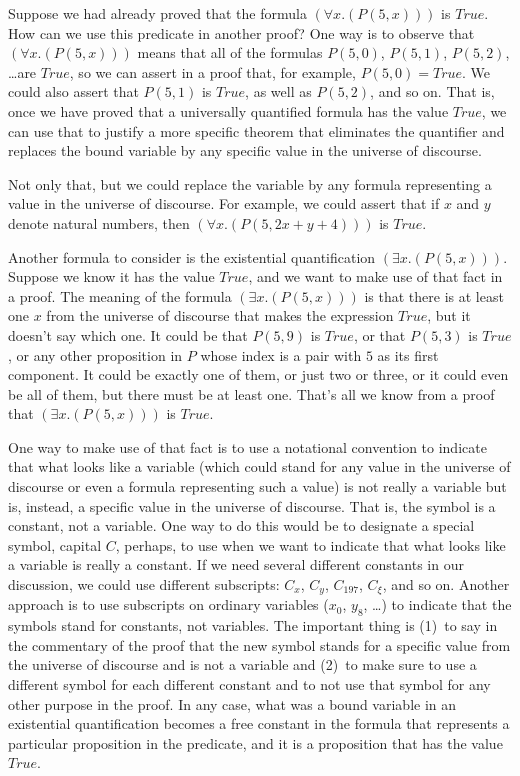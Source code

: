{{Suppose we had already proved that the formula $(\forall x.(P(5, x)))$ is $True$.
How can we use this predicate in another proof?
One way is to observe that $(\forall x.(P(5, x)))$ means that all of the formulas
$P(5, 0)$, $P(5, 1)$, $P(5, 2)$, \dots are $True$,
so we can assert in a proof that, for example,
$P(5, 0) = True$. We could also assert that $P(5, 1)$ is $True$, as well as $P(5, 2)$, and so on.
That is, once we have proved that a universally quantified formula has the value $True$,
we can use that to justify a more specific theorem that
eliminates the quantifier and replaces the bound variable by any specific value
in the universe of discourse.

Not only that, but we could replace the variable by any formula
representing a value in the universe of discourse.
For example, we could assert that if $x$ and $y$ denote natural numbers,
then $(\forall x.(P(5, 2x + y + 4)))$ is $True$.

Another formula to consider is the existential quantification $(\exists x.(P(5, x)))$.
Suppose we know it has the value $True$, and we want to make use of that fact in a proof.
The meaning of the formula $(\exists x.(P(5, x)))$ is that
there is at least one $x$ from the universe of discourse that makes the expression $True$,
but it doesn't say which one.
It could be that $P(5, 9)$ is $True$, or that $P(5, 3)$ is $True$,
or any other proposition in $P$ whose index is a pair with $5$ as its first component.
It could be exactly one of them,
or just two or three, or it could even be all of them, but
there must be at least one. That's all we know
from a proof that $(\exists x.(P(5, x)))$ is $True$.

One way to make use of that fact is to use a notational convention
to indicate that what looks like a variable (which could stand for any
value in the universe of discourse or even a formula representing such a value)
is not really a variable but is, instead, a specific value in the universe of
discourse. That is, the symbol is a constant, not a variable.
One way to do this would be to designate a special symbol, capital $C$, perhaps,
to use when we want to indicate that what looks like a variable is really a constant.
\label{def:skolem-constant}
If we need several different constants in our discussion, we could use different
subscripts: $C_x$, $C_y$, $C_{197}$, $C_{\xi}$, and so on.
Another approach is to use subscripts on ordinary variables ($x_0$, $y_8$, \dots)
to indicate that the symbols stand for constants, not variables.
The important thing is (1)~to say in the commentary of the proof that the new
symbol stands for a specific value from the universe of discourse and is not a variable
and (2)~to make sure to use a different symbol for each different constant and to not use that
symbol for any other purpose in the proof.
In any case, what was a bound variable
in an existential quantification
becomes a free constant in the formula that represents a particular proposition in the
predicate, and it is a proposition that has the value $True$.

}}
